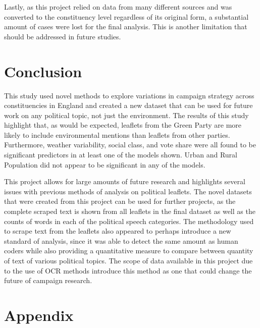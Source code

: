 \documentclass[preprint,12pt,authoryear]{elsarticle}
\begin{document}
Lastly, as this project relied on data from many different sources and was converted to the constituency level regardless of its original form, a substantial amount of cases were lost for the final analysis. This is another limitation that should be addressed in future studies.
	


\section{Conclusion}

This study used novel methods to explore variations in campaign strategy across constituencies in England and created a new dataset that can be used for future work on any political topic, not just the environment. The results of this study highlight that, as would be expected, leaflets from the Green Party are more likely to include environmental mentions than leaflets from other parties. Furthermore, weather variability, social class, and vote share were all found to be significant predictors in at least one of the models shown. Urban and Rural Population did not appear to be significant in any of the models.

This project allows for large amounts of future research and highlights several issues with previous methods of analysis on political leaflets. The novel datasets that were created from this project can be used for further projects, as the complete scraped text is shown from all leaflets in the final dataset as well as the counts of words in each of the political speech categories. The methodology used to scrape text from the leaflets also appeared to perhaps introduce a new standard of analysis, since it was able to detect the same amount as human coders while also providing a quantitative measure to compare between quantity of text of various political topics. The scope of data available in this project due to the use of OCR methods introduce this method as one that could change the future of campaign research.

 



  


\newpage








\section{Appendix}
\end{document}
